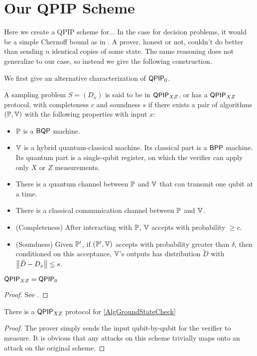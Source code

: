 \section{Our QPIP Scheme}

Here we create a QPIP scheme for...  In the case for decision problems, it would be a simple Chernoff bound as in \cite{kitaev2002classical}. A prover, honest or not, couldn't do better than sending $n$ identical copies of some state. The same reasoning does not generalize to our case, so instead we give the following construction.

We first give an alternative characterization of $\operatorname{\mathsf{QPIP}}_0$.

\begin{definition}
	A sampling problem $S=(D_x)$ is said to be in $\operatorname{\mathsf{QPIP}}_{XZ}$, or has a $\operatorname{\mathsf{QPIP}}_{XZ}$ protocol,  with completeness $c$ and soundness $s$ if there exists a pair of algorithms $(\mathbb{P}, \mathbb{V})$ with the following properties with input $x$:
	\begin{itemize}
		\item $\mathbb{P}$ is a $\operatorname{\mathsf{BQP}}$ machine.
		\item $\mathbb{V}$ is a hybrid quantum-classical machine. Its classical part is a $\operatorname{\mathsf{BPP}}$ machine. Its quantum part is a single-qubit register, on which the verifier can apply only $X$ or $Z$ measurements.
		\item There is a quantum channel between $\mathbb{P}$ and $\mathbb{V}$ that can transmit one qubit at a time.
		\item There is a classical communication channel between $\mathbb{P}$ and $\mathbb{V}$.
		\item (Completeness) After interacting with $\mathbb{P}$, $\mathbb{V}$ accepts with probability $\geq c$.
		\item (Soundness) Given $\mathbb{P}'$, if $(\mathbb{P}', \mathbb{V})$ accepts with probability greater than $\delta$, then conditioned on this acceptance, $\mathbb{V}$'s outputs has distribution $\tilde{D}$ with $\left\lVert\tilde{D}-D_x\right\rVert\leq s$.
	\end{itemize}
\end{definition}

\begin{theorem}
	$\operatorname{\mathsf{QPIP}}_{XZ}=\operatorname{\mathsf{QPIP}}_0$
\end{theorem}
\begin{proof}
	See \cite{mahadev_delegation}.
\end{proof}

\begin{theorem}
	There is a $\operatorname{\mathsf{QPIP}}_{XZ}$ protocol for \autoref{AlgGroundStateCheck}
\end{theorem}
\begin{proof}
	The prover simply sends the input qubit-by-qubit for the verifier to measure. It is obvious that any attacks on this scheme trivially maps onto an attack on the original scheme.
\end{proof}

